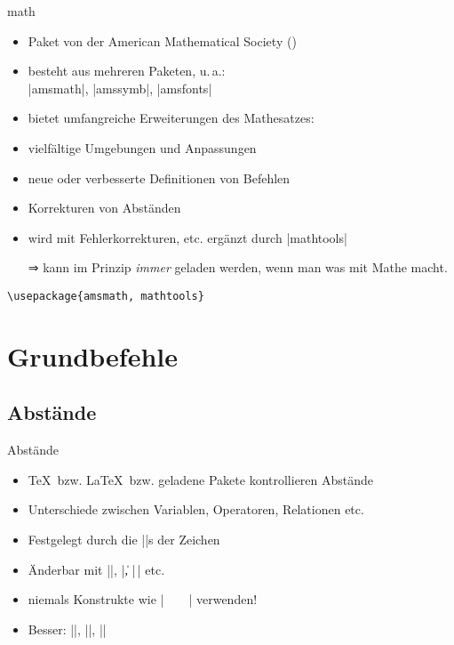 \documentclass[
	vorläufig=true,
	datum=2016-11-04,
	titel={Mathematiksatz I},
	web=false,
]{../tex/latexkurs-slides}
\begin{document}
\begin{frame}[fragile]{math}
	\begin{itemize}
		\item Paket von der American Mathematical Society ()
		\item besteht aus mehreren Paketen, u.\,a.:\\%
		|amsmath|, |amssymb|, |amsfonts|%
		\item bietet umfangreiche Erweiterungen des Mathesatzes:
		\item vielfältige Umgebungen und Anpassungen
		\item neue oder verbesserte Definitionen von Befehlen
		\item Korrekturen von Abständen
		\item {}
		\pause wird mit Fehlerkorrekturen, etc. ergänzt durch |mathtools| 
		\pause
		\item[⇒] kann im Prinzip \emph{immer} geladen werden, wenn man was mit Mathe macht.
	\end{itemize}
\begin{lstlisting}
\usepackage{amsmath, mathtools}
\end{lstlisting}
\end{frame}

\section{Grundbefehle}
\subsection{Abstände}
\begin{frame}[fragile]{Abstände}
	\begin{itemize}
		\item \TeX\ bzw. \LaTeX\ bzw. geladene Pakete kontrollieren Abstände
		\item Unterschiede zwischen Variablen, Operatoren, Relationen etc.
		\item Festgelegt durch die |\mathcode|s der Zeichen
		\item Änderbar mit |\kern|, |\|, |\,| etc.
		\item \alert{niemals} Konstrukte wie |\ \ \ \ | verwenden!
		\item Besser: |\quad|, |\qquad|, |\hspace{1em}|
	\end{itemize}
\end{frame}
\end{document}
